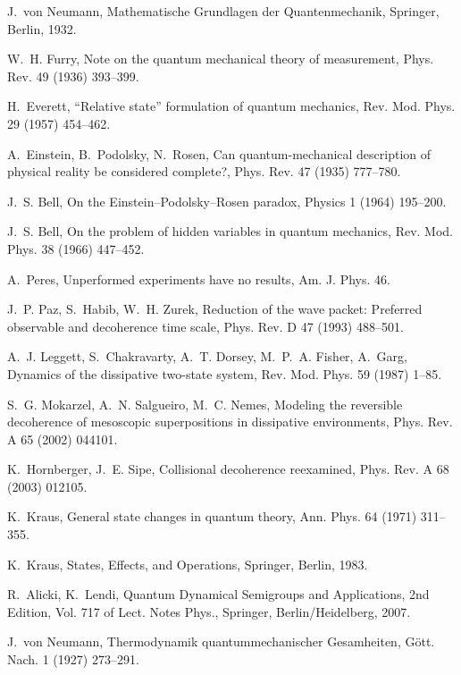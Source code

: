 \documentclass[3p,sort&compress]{elsarticle}
\begin{document}
\begin{thebibliography}{100}
J.~von Neumann, Mathematische {G}rundlagen der {Q}uantenmechanik, Springer,
  Berlin, 1932.

W.~H. Furry, Note on the quantum mechanical theory of measurement, Phys. Rev.
  49 (1936) 393--399.

H.~Everett, ``{R}elative state'' formulation of quantum mechanics, Rev. Mod.
  Phys. 29 (1957) 454--462.

A.~Einstein, B.~Podolsky, N.~Rosen, Can quantum-mechanical description of
  physical reality be considered complete?, Phys. Rev. 47 (1935) 777--780.

J.~S. Bell, On the {E}instein--{P}odolsky--{R}osen paradox, Physics 1 (1964)
  195--200.

J.~S. Bell, On the problem of hidden variables in quantum mechanics, Rev. Mod.
  Phys. 38 (1966) 447--452.

A.~Peres, Unperformed experiments have no results, Am. J. Phys. 46.

J.~P. Paz, S.~Habib, W.~H. Zurek, Reduction of the wave packet: {P}referred
  observable and decoherence time scale, Phys. Rev. D 47 (1993) 488--501.

A.~J. Leggett, S.~Chakravarty, A.~T. Dorsey, M.~P.~A. Fisher, A.~Garg, Dynamics
  of the dissipative two-state system, Rev. Mod. Phys. 59 (1987) 1--85.

S.~G. Mokarzel, A.~N. Salgueiro, M.~C. Nemes, Modeling the reversible
  decoherence of mesoscopic superpositions in dissipative environments, Phys.
  Rev. A 65 (2002) 044101.

K.~Hornberger, J.~E. Sipe, Collisional decoherence reexamined, Phys. Rev. A 68
  (2003) 012105.

K.~Kraus, General state changes in quantum theory, Ann. Phys. 64 (1971)
  311--355.

K.~Kraus, States, Effects, and Operations, Springer, Berlin, 1983.

R.~Alicki, K.~Lendi, Quantum Dynamical Semigroups and Applications, 2nd
  Edition, Vol. 717 of Lect. Notes Phys., Springer, Berlin/Heidelberg, 2007.

J.~von Neumann, Thermodynamik quantummechanischer {G}esamheiten, G{\"o}tt.
  Nach. 1 (1927) 273--291.


\end{thebibliography}
\end{document}
